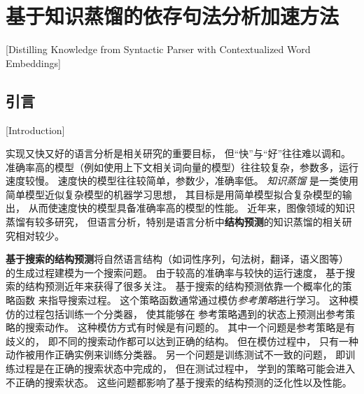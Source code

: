 \chapter{基于知识蒸馏的依存句法分析加速方法}[Distilling Knowledge from Syntactic Parser with Contextualized Word Embeddings]\label{chp:distill}

\section{引言}[Introduction]

实现又快又好的语言分析是相关研究的重要目标，
但``快''与``好''往往难以调和。
准确率高的模型（例如使用上下文相关词向量的模型）往往较复杂，参数多，运行速度较慢。
速度快的模型往往较简单，参数少，准确率低。
\textit{知识蒸馏}\cite{DBLP:journals/corr/HintonVD15}
是一类使用简单模型近似复杂模型的机器学习思想，
其目标是用简单模型拟合复杂模型的输出，
从而使速度快的模型具备准确率高的模型的性能。
近年来，图像领域的知识蒸馏有较多研究，
但语言分析，特别是语言分析中\textbf{结构预测}的知识蒸馏的相关研究相对较少。

\textbf{基于搜索的结构预测}将自然语言结构（如词性序列，句法树，翻译，语义图等）
的生成过程建模为一个搜索问题\cite{collins-roark:2004:ACL,
	liang-EtAl:2006:COLACL,
	zhang-clark:2008:EMNLP,
	huang-fayong-guo:2012:NAACL-HLT,
	NIPS2014_5346,
	goodman-vlachos-naradowsky:2016:P16-1}。
由于较高的准确率与较快的运行速度，
基于搜索的结构预测近年来获得了很多关注。
基于搜索的结构预测依靠一个概率化的策略函数
来指导搜索过程。
这个策略函数通常通过模仿\textit{参考策略}进行学习。
这种模仿的过程包括训练一个分类器，
使其能够在
参考策略遇到的状态上预测出参考策略的搜索动作。
这种模仿方式有时候是有问题的。
其中一个问题是参考策略是有歧义的，
即不同的搜索动作都可以达到正确的结构。
但在模仿过程中，
只有一种动作被用作正确实例来训练分类器\cite{goldberg-nivre:2012:PAPERS}。
另一个问题是训练测试不一致的问题，
即训练过程是在正确的搜索状态中完成的，
但在测试过程中，
学到的策略可能会进入不正确的搜索状态\cite{pmlr-v9-ross10a,pmlr-v15-ross11a}。
这些问题都影响了基于搜索的结构预测的泛化性以及性能。

